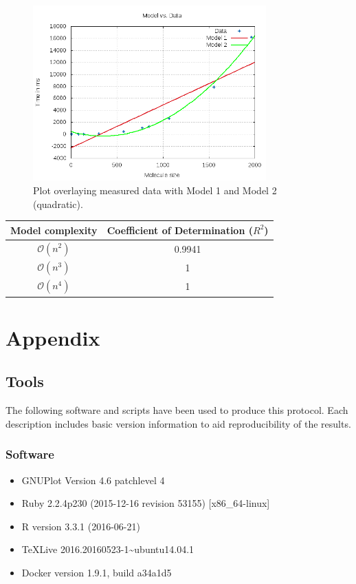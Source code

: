 \documentclass[a4paper,12pt]{article}
\begin{document}
\begin{figure}[!h]
  \centering
    \includegraphics[width=0.8\textwidth]{images/solver-perf-model.png}
  \caption{Plot overlaying measured data with Model 1 and Model 2 (quadratic).}
\end{figure}

\begin{center}
  \begin{tabular}{ | c | c | }
    \hline
    \textbf{Model complexity} & \textbf{Coefficient of Determination ($R^2$)} \\ \hline
    \hline
        $\mathcal{O}(n^2)$ & 0.9941 \\ \hline
        $\mathcal{O}(n^3)$ & 1 \\ \hline
        $\mathcal{O}(n^4)$ & 1 \\ \hline
  \end{tabular}
\end{center}

\pagebreak

\section{Appendix}

\subsection{Tools}

The following software and scripts have been used to produce this protocol. Each description
includes basic version information to aid reproducibility of the results.

\subsubsection{Software}
\begin{itemize}
    \item GNUPlot Version 4.6 patchlevel 4
    \item Ruby 2.2.4p230 (2015-12-16 revision 53155) [x86\_64-linux]
    \item R version 3.3.1 (2016-06-21)
    \item TeXLive 2016.20160523-1\~{}ubuntu14.04.1
    \item Docker version 1.9.1, build a34a1d5
\end{itemize}
\end{document}
